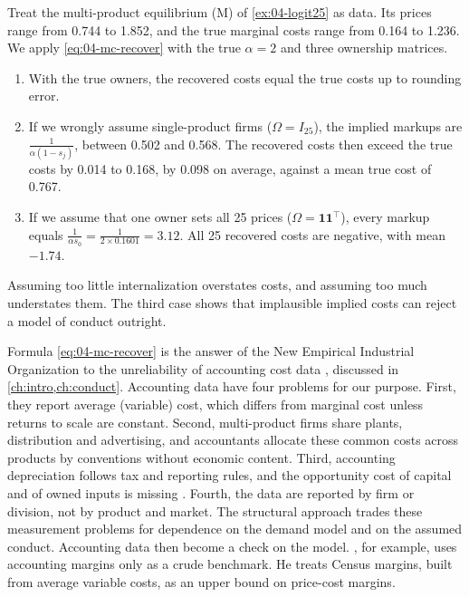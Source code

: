 \begin{example}\label{ex:04-mc-recovery}
Treat the multi-product equilibrium (M) of \cref{ex:04-logit25} as data. Its prices range from 0.744 to 1.852,
and the true marginal costs range from 0.164 to 1.236. We apply \eqref{eq:04-mc-recover} with the true $\alpha
= 2$ and three ownership matrices.
\begin{enumerate}
  \item With the true owners, the recovered costs equal the true costs up to rounding error.
  \item If we wrongly assume single-product firms ($\Omega = I_{25}$), the implied markups are
  $\frac{1}{\alpha(1 - s_j)}$, between 0.502 and 0.568. The recovered costs then exceed the true costs by 0.014 to
  0.168, by 0.098 on average, against a mean true cost of 0.767.
  \item If we assume that one owner sets all 25 prices ($\Omega = \mathbf{1}\mathbf{1}^\top$), every markup equals
  $\frac{1}{\alpha s_0} = \frac{1}{2 \times 0.1601} = 3.12$. All 25 recovered costs are negative, with mean $-1.74$.
\end{enumerate}
Assuming too little internalization overstates costs, and assuming too much understates them. The third case
shows that implausible implied costs can reject a model of conduct outright.
\end{example}

Formula \eqref{eq:04-mc-recover} is the answer of the New Empirical Industrial Organization to the unreliability
of accounting cost data \citep{Bresnahan1989}, discussed in \cref{ch:intro,ch:conduct}. Accounting data have
four problems for our purpose. First, they report average (variable) cost, which differs from marginal cost
unless returns to scale are constant. Second, multi-product firms share plants, distribution and advertising, and
accountants allocate these common costs across products by conventions without economic content. Third,
accounting depreciation follows tax and reporting rules, and the opportunity cost of capital and of owned inputs
is missing \citep{FisherMcGowan1983}. Fourth, the data are reported by firm or division, not by product and
market. The structural approach trades these measurement problems for dependence on the demand model and on the
assumed conduct. Accounting data then become a check on the model. \citet[p.~333]{Nevo2001}, for example, uses
accounting margins only as a crude benchmark. He treats Census margins, built from average variable costs, as an
upper bound on price-cost margins.


